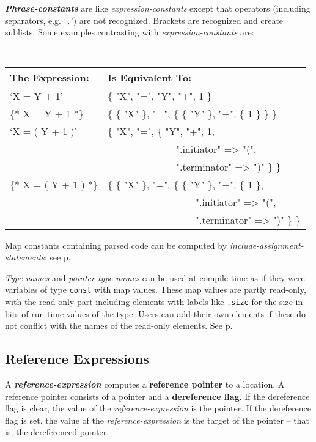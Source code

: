 \documentclass[12pt]{article}
\newcommand{\key}[1]{{\rm \bfseries #1}}
\newcommand{\emkey}[1]{{\em \bfseries #1}}
\newcommand{\pagref}[1]{p\pageref{#1}}
\begin{document}
\emkey{Phrase-constants}\label{PHRASE-CONSTANT}
are like {\em expression-constants} except that
operators (including separators, e.g. `{\tt ,}') are not recognized.
Brackets are recognized and create sublists.  Some examples contrasting
with {\em expression-constants} are:
\begin{center} \tt
\begin{tabular}{l@{~~~}l}
\rm The Expression:	& \rm Is Equivalent To:
\\\hline
`X = Y + 1'			& \{ "X", "=", "Y", "+", 1 \}
\\[0.5ex]
\{* X = Y + 1 *\}		& \{ \{ "X" \}, "=",
                                     \{ \{ "Y" \}, "+", \{ 1 \} \} \}
\\[0.5ex]
`X = ( Y + 1 )'		& \{ "X", "=", \{ "Y", "+", 1, \\
                        & ~~~~~~~~~~~~~~".initiator" => "(", \\
                        & ~~~~~~~~~~~~~~".terminator" => ")" \} \}
\\[0.5ex]
\{* X = ( Y + 1 ) *\}	& \{ \{ "X" \}, "=", \{ \{ "Y" \}, "+", \{ 1 \}, \\
                        & ~~~~~~~~~~~~~~~~~~".initiator" => "(", \\
                        & ~~~~~~~~~~~~~~~~~~".terminator" => ")" \} \}
\end{tabular}
\end{center}

Map constants containing parsed code can be computed
by {\em include-assignment-statements}:
see \pagref{INCLUDE-ASSIGNMENT-STATEMENT}.

{\em Type-names} and {\em pointer-type-names} can be used at
compile-time as if they were variables of type {\tt const}
with map values.  These map values are partly read-only,
with the read-only part including elements with labels like
{\tt .size} for the size in bits of run-time values of the type.
Users can add their own elements if these do not conflict
with the names of the read-only elements.  See \pagref{TYPE-MAPS}.

\subsection{Reference Expressions}
\label{REFERENCE-EXPRESSIONS}

A \emkey{reference-expression} computes a
\key{reference pointer}\label{REFERENCE-POINTER} to a location.
A reference pointer consists of a pointer and a
\key{dereference flag}.  If the dereference flag is clear, the value of
the {\em reference-expression} is the pointer.  If the dereference flag
is set, the value of the {\em reference-expression} is the target of
the pointer -- that is, the dereferenced pointer.
\end{document}
